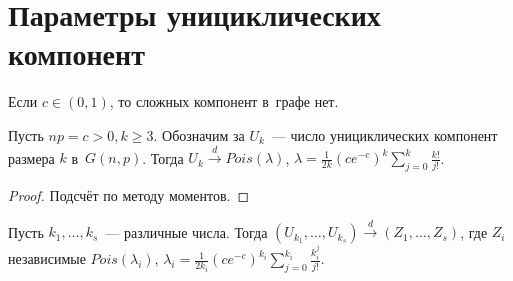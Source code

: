 \documentclass{article}
\begin{document}
\section{Параметры унициклических компонент}

\begin{corollary}
	Если $c \in (0, 1)$, то сложных компонент в~графе нет.
\end{corollary}

\begin{theorem}
	Пусть $np = c > 0, k \ge 3$. Обозначим за $U_k$~--- число унициклических компонент размера $k$
	в~$G(n, p)$. Тогда $U_k \overset{d}\rightarrow Pois(\lambda)$, $\lambda = \frac{1}{2k} (c
	e^{-c})^k \sum\limits_{j=0}^k \frac{k!}{j!}$.
\end{theorem}
\begin{proof}
	Подсчёт по методу моментов.
\end{proof}

\begin{theorem}
	Пусть $k_1, \ldots, k_s$~--- различные числа. Тогда $(U_{k_1}, \ldots, U_{k_s})
	\overset{d}\rightarrow (Z_1, \ldots, Z_s)$, где $Z_i$ независимые $Pois(\lambda_i)$, $\lambda_i =
	\frac{1}{2k_i} (ce^{-c})^{k_i} \sum\limits_{j=0}^{k_i} \frac{k_i^j}{j!}$.
\end{theorem}
\end{document}
